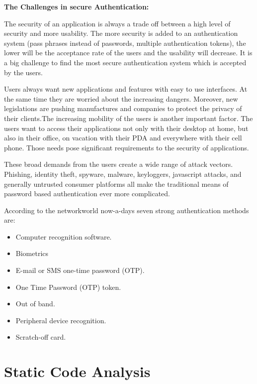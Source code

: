 \textbf{The Challenges in secure Authentication:}

The security of an application is always a trade off between a high level of security and more usability. The more security is added to an authentication system (pass phrases instead of passwords, multiple authentication tokens), the lower will be the acceptance rate of the users and the usability will decrease. It is a big challenge to find the most secure authentication system which is accepted by the users. 

Users always want new applications and features with easy to use interfaces. At the same time they are worried about the increasing dangers. Moreover, new legislations are pushing manufactures and companies to protect the privacy of their clients.The increasing mobility of the users is another important factor. The users want to access their applications not only with their desktop at home, but also in their office, on vacation with their PDA and everywhere with their cell phone. Those needs pose significant requirements to the security of applications. 

These broad demands from the users create a wide range of attack vectors. Phishing, identity theft, spyware, malware, keyloggers, javascript attacks, and generally untrusted consumer platforms all make the traditional means of password based authentication ever more complicated.


According to the networkworld \cite{ref_21_networld} now-a-days seven strong authentication methods are:
\begin{itemize}
\item Computer recognition software.
\item Biometrics
\item E-mail or SMS one-time password (OTP).
\item One Time Password (OTP) token.
\item Out of band.
\item Peripheral device recognition.
\item Scratch-off card.
\end{itemize}	

\section{Static Code Analysis}

